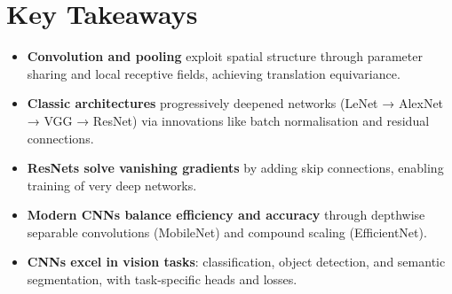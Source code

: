 
\section*{Key Takeaways}

\begin{keytakeaways}
\begin{itemize}[leftmargin=2em]
    \item \textbf{Convolution and pooling} exploit spatial structure through parameter sharing and local receptive fields, achieving translation equivariance.
    \item \textbf{Classic architectures} progressively deepened networks (LeNet → AlexNet → VGG → ResNet) via innovations like batch normalisation and residual connections.
    \item \textbf{ResNets solve vanishing gradients} by adding skip connections, enabling training of very deep networks.
    \item \textbf{Modern CNNs balance efficiency and accuracy} through depthwise separable convolutions (MobileNet) and compound scaling (EfficientNet).
    \item \textbf{CNNs excel in vision tasks}: classification, object detection, and semantic segmentation, with task-specific heads and losses.
\end{itemize}
\end{keytakeaways}


